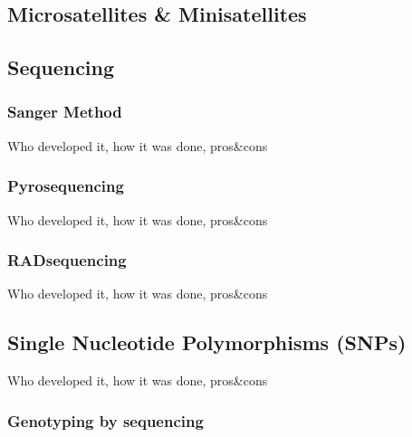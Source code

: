 \documentclass[11pt, oneside]{article}
\begin{document}
\subsection{Microsatellites \& Minisatellites}

\subsection{Sequencing}
\subsubsection{Sanger Method}
Who developed it, how it was done, pros\&cons
\subsubsection{Pyrosequencing}
Who developed it, how it was done, pros\&cons
\subsubsection{RADsequencing}
Who developed it, how it was done, pros\&cons

\subsection{Single Nucleotide Polymorphisms (SNPs)}
Who developed it, how it was done, pros\&cons
\subsubsection{Genotyping by sequencing}
\end{document}
